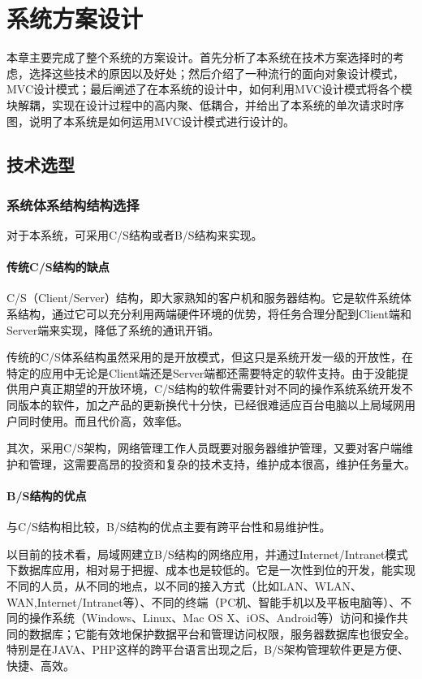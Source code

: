 
\chapter{系统方案设计}
本章主要完成了整个系统的方案设计。首先分析了本系统在技术方案选择时的考虑，选择这些技术的原因以及好处；然后介绍了一种流行的面向对象设计模式，MVC设计模式；最后阐述了在本系统的设计中，如何利用MVC设计模式将各个模块解耦，实现在设计过程中的高内聚、低耦合，并给出了本系统的单次请求时序图，说明了本系统是如何运用MVC设计模式进行设计的。

\section{技术选型}
\subsection{系统体系结构结构选择}
对于本系统，可采用C/S结构或者B/S结构来实现。
\subsubsection{传统C/S结构的缺点}
C/S（Client/Server）结构，即大家熟知的客户机和服务器结构。它是软件系统体系结构，通过它可以充分利用两端硬件环境的优势，将任务合理分配到Client端和Server端来实现，降低了系统的通讯开销。

传统的C/S体系结构虽然采用的是开放模式，但这只是系统开发一级的开放性，在特定的应用中无论是Client端还是Server端都还需要特定的软件支持。由于没能提供用户真正期望的开放环境，C/S结构的软件需要针对不同的操作系统系统开发不同版本的软件，加之产品的更新换代十分快，已经很难适应百台电脑以上局域网用户同时使用。而且代价高，效率低。

其次，采用C/S架构，网络管理工作人员既要对服务器维护管理，又要对客户端维护和管理，这需要高昂的投资和复杂的技术支持，维护成本很高，维护任务量大。

\subsubsection{B/S结构的优点}
与C/S结构相比较，B/S结构的优点主要有跨平台性和易维护性。

以目前的技术看，局域网建立B/S结构的网络应用，并通过Internet/Intranet模式下数据库应用，相对易于把握、成本也是较低的。它是一次性到位的开发，能实现不同的人员，从不同的地点，以不同的接入方式（比如LAN、WLAN、WAN,Internet/Intranet等）、不同的终端（PC机、智能手机以及平板电脑等）、不同的操作系统（Windows、Linux、Mac OS X、iOS、Android等）访问和操作共同的数据库；它能有效地保护数据平台和管理访问权限，服务器数据库也很安全。特别是在JAVA、PHP这样的跨平台语言出现之后，B/S架构管理软件更是方便、快捷、高效。

